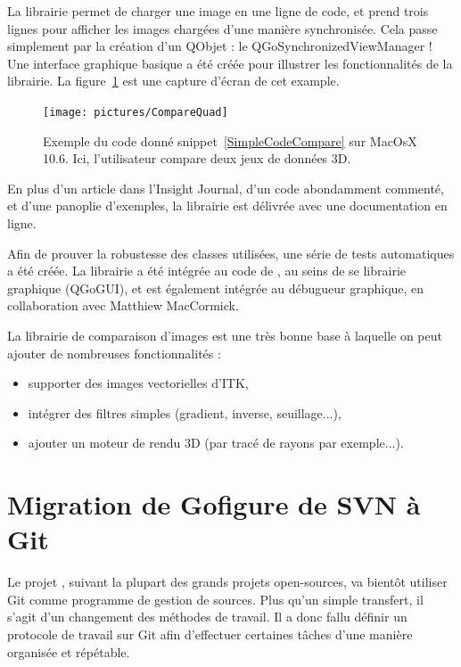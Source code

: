 La librairie permet de charger une image en une ligne de code,
et prend trois lignes pour afficher les images chargées d'une manière synchronisée.
Cela passe simplement par la création d'un QObjet : le QGoSynchronizedViewManager !\\

Une interface graphique basique a été créée pour illustrer les fonctionnalités de la librairie. La figure~\ref{fig:CompareQuad} est une capture d'écran de cet example.\\
\begin{figure}[h]
\center
\texttt{[image: pictures/CompareQuad]}
\caption{Exemple du code donné snippet~\ref{SimpleCodeCompare} sur MacOsX 10.6. Ici, l'utilisateur compare deux jeux de données 3D.}
\label{fig:CompareQuad}
\end{figure}

En plus d'un article dans l'Insight Journal, d'un code abondamment commenté, et d'une panoplie d'exemples,
la librairie est délivrée avec une documentation en ligne.

Afin de prouver la robustesse des classes utilisées, une série de tests automatiques a été créée.
La librairie a été intégrée au code de {\gofigure}, au seins de se librairie graphique (QGoGUI),
et est également intégrée au débugueur graphique, en collaboration avec Matthiew MacCormick.

La librairie de comparaison d'images est une très bonne base à laquelle on peut ajouter de nombreuses fonctionnalités :\begin{itemize}
  \item supporter des images vectorielles d'ITK,
  \item intégrer des filtres simples (gradient, inverse, seuillage...),
  \item ajouter un moteur de rendu 3D (par tracé de rayons par exemple...).
\end{itemize}








\section{Migration de Gofigure de SVN à Git}

Le projet \gofigure, suivant la plupart des grands projets open-sources, va bientôt utiliser Git comme programme de gestion de sources.
Plus qu'un simple transfert, il s'agit d'un changement des méthodes de travail.
Il a donc fallu définir un protocole de travail sur Git 
afin d'effectuer certaines tâches d'une manière organisée et répétable. 

